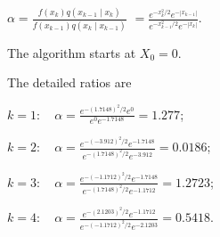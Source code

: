 $\alpha=\frac{f(x_k)q(x_{k-1}\mid x_k)}{f(x_{k-1})q(x_k\mid x_{k-1})}$
$=\frac{e^{-x_k^2/2}e^{-|x_{k-1}|}}{e^{-x_{k-1}^2/2}e^{-|x_k|}}$.

The algorithm starts at $X_0=0$.

\noindent{}

The detailed ratios are

$k=1:\quad\alpha=\frac{e^{-(1.7148)^2/2}e^0}{e^0e^{-1.7148}}=1.277$;

$k=2:\quad\alpha=\frac{e^{-(-3.912)^2/2}e^{-1.7148}}{e^{-(1.7148)^2/2}e^{-3.912}}=0.0186$;

$k=3:\quad\alpha=\frac{e^{-(-1.1712)^2/2}e^{-1.7148}}{e^{-(1.7148)^2/2}e^{-1.1712}}=1.2723$;

$k=4:\quad\alpha=\frac{e^{-(2.1203)^2/2}e^{-1.1712}}{e^{-(-1.1712)^2/2}e^{-2.1203}}=0.5418$.
